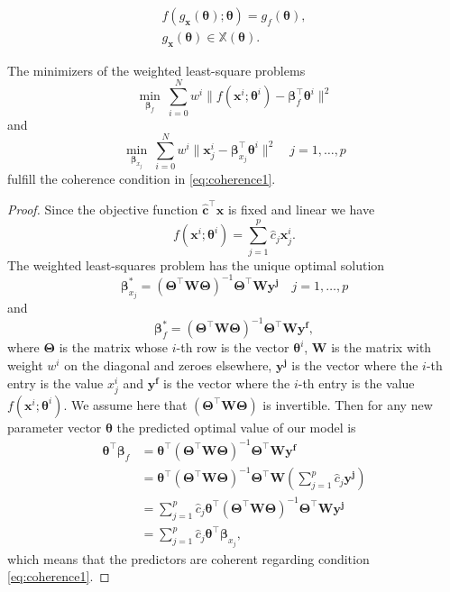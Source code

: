 \documentclass[10pt,a4paper]{amsart}
\begin{document}
\begin{gather}
    f(g_{\bm{x}}(\bm{\theta}); \bm{\theta}) = g_{f}(\bm{\theta}), \label{eq:coherence1}\\
    g_{\bm{x}}(\bm{\theta}) \in \mathbb X(\bm{\theta}).\label{eq:coherence2}
\end{gather}

\begin{theorem}\label{thm:provably_coherent}
The minimizers of the weighted least-square problems
\[
\min_{\bm{\beta}_{f}} \ \sum_{i=0}^{N} w^i\| f(\bm{x}^i;\bm{\theta}^i) - \bm{\beta}_{f}^\intercal\bm{\theta}^i \|^2 \]
and 
\[
\min_{\bm{\beta}_{x_j}} \ \sum_{i=0}^{N} w^i\| \bm{x}^i_j - \bm{\beta}_{x_j}^\intercal\bm{\theta}^i \|^2 \quad j=1,\ldots ,p
\]
fulfill the coherence condition in \eqref{eq:coherence1}.
\end{theorem}

\begin{proof}
Since the objective function $\bm{\hat c}^\intercal \bm{x}$ is fixed and linear we have
\[
f(\bm{x}^i;\bm{\theta}^i) = \sum_{j=1}^{p} \hat c_j \bm{x}^i_j.
\]
The weighted least-squares problem has the unique optimal solution
\[
\bm{\beta}_{x_j}^* = (\bm{\Theta}^\intercal \bm{W}\bm{\Theta})^{-1} \bm{\Theta}^\intercal \bm{W} \bm{y^j} \quad j=1,\ldots ,p
\]
and 
\[
\bm{\beta}_{f}^* = (\bm{\Theta}^\intercal \bm{W}\bm{\Theta})^{-1} \bm{\Theta}^\intercal \bm{W} \bm{y^f},
\]
where $\bm{\Theta}$ is the matrix whose $i$-th row is the vector $\bm{\theta}^i$, $\bm{W}$ is the matrix with weight $w^i$ on the diagonal and zeroes elsewhere, $\bm{y^j}$ is the vector where the $i$-th entry is the value $x_j^i$ and $\bm{y^f}$ is the vector where the $i$-th entry is the value $f(\bm{x}^i;\bm{\theta}^i)$. We assume here that $(\bm{\Theta}^\intercal \bm{W}\bm{\Theta})$ is invertible. Then for any new parameter vector $\bm{\theta}$ the predicted optimal value of our model is
\begin{align*}
\bm{\theta}^\intercal\bm{\beta}_{f} & = \bm{\theta}^\intercal (\bm{\Theta}^\intercal \bm{W}\bm{\Theta})^{-1} \bm{\Theta}^\intercal \bm{W} \bm{y^f}  \\
& = \bm{\theta}^\intercal (\bm{\Theta}^\intercal \bm{W} \bm{\Theta})^{-1} \bm{\Theta}^\intercal \bm{W} \left( \sum_{j=1}^{p} \hat c_j \bm{y^{j}}\right) \\
& = \sum_{j=1}^{p} \hat c_j \bm{\theta}^\intercal (\bm{\Theta}^\intercal \bm{W}\bm{\Theta})^{-1} \bm{\Theta}^\intercal \bm{W} \bm{y^{j}} \\
& = \sum_{j=1}^{p} \hat c_j \bm{\theta}^\intercal\bm{\beta}_{x_j},
\end{align*}
which means that the predictors are coherent regarding condition \eqref{eq:coherence1}. 
\end{proof}
\end{document}

